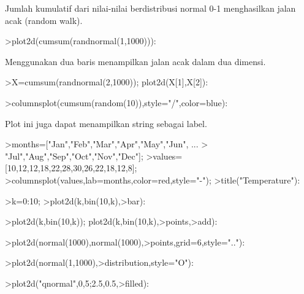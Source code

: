\documentclass[a4paper,10pt]{article}
\begin{document}
\begin{eulernotebook}
\begin{eulercomment}
\begin{eulercomment}
\begin{eulercomment}
\begin{eulercomment}
\begin{eulercomment}
\begin{eulercomment}
\begin{eulercomment}
Jumlah kumulatif dari nilai-nilai berdistribusi normal 0-1 menghasilkan jalan acak
(random walk).
\end{eulercomment}
\begin{eulerprompt}
>plot2d(cumsum(randnormal(1,1000))):
\end{eulerprompt}
\begin{eulercomment}
Menggunakan dua baris menampilkan jalan acak dalam dua dimensi.
\end{eulercomment}
\begin{eulerprompt}
>X=cumsum(randnormal(2,1000)); plot2d(X[1],X[2]):
\end{eulerprompt}
\begin{eulerprompt}
>columnsplot(cumsum(random(10)),style="/",color=blue):
\end{eulerprompt}
\begin{eulercomment}
Plot ini juga dapat menampilkan string sebagai label.
\end{eulercomment}
\begin{eulerprompt}
>months=["Jan","Feb","Mar","Apr","May","Jun", ...
>  "Jul","Aug","Sep","Oct","Nov","Dec"];
>values=[10,12,12,18,22,28,30,26,22,18,12,8];
>columnsplot(values,lab=months,color=red,style="-");
>title("Temperature"):
\end{eulerprompt}
\begin{eulerprompt}
>k=0:10;
>plot2d(k,bin(10,k),>bar):
\end{eulerprompt}
\begin{eulerprompt}
>plot2d(k,bin(10,k)); plot2d(k,bin(10,k),>points,>add):
\end{eulerprompt}
\begin{eulerprompt}
>plot2d(normal(1000),normal(1000),>points,grid=6,style=".."):
\end{eulerprompt}
\begin{eulerprompt}
>plot2d(normal(1,1000),>distribution,style="O"):
\end{eulerprompt}
\begin{eulerprompt}
>plot2d("qnormal",0,5;2.5,0.5,>filled):
\end{eulerprompt}

\end{eulercomment}
\end{eulercomment}
\end{eulercomment}
\end{eulercomment}
\end{eulercomment}
\end{eulercomment}
\end{eulernotebook}
\end{document}

